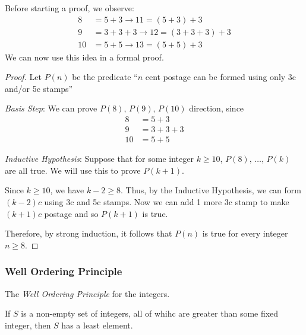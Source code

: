 Before starting a proof, we observe:
\begin{align*}
	8 &= 5 + 3 \rightarrow 11 = (5 + 3) + 3 \\
	9 &= 3 + 3 + 3 \rightarrow 12 = (3 + 3 + 3) + 3 \\
	10 &= 5 + 5 \rightarrow 13 = (5+5)+3
\end{align*}
We can now use this idea in a formal proof.
\begin{proof}
	Let $P(n)$ be the predicate ``$n$ cent postage can be formed using only 3c and/or 5c stamps''

	\emph{Basis Step}: We can prove $P(8),\,P(9),\,P(10)$ direction, since
	\begin{align*}
		8 &= 5 + 3 \\
		9 &= 3 + 3 + 3 \\
		10 &= 5 + 5
	\end{align*}

	\emph{Inductive Hypothesis}: Suppose that for some integer $k \geq 10$, $P(8),\,\dots,\,P(k)$ are all true. We will use this to prove $P(k+1)$.

	Since $k\geq 10$, we have $k - 2 \geq 8$. Thus, by the Inductive Hypothesis, we can form $(k-2)c$ using 3c and 5c stamps. Now we can add 1 more 3c stamp to make $(k+1)c$ postage and so $P(k+1)$ is true.

	Therefore, by strong induction, it follows that $P(n)$ is true for every integer $n\geq 8$.
\end{proof}

\subsubsection{Well Ordering Principle}
\begin{definition}
	The \emph{Well Ordering Principle} for the integers.

	If $S$ is a non-empty set of integers, all of whihc are greater than some fixed integer, then $S$ has a least element.
\end{definition}
